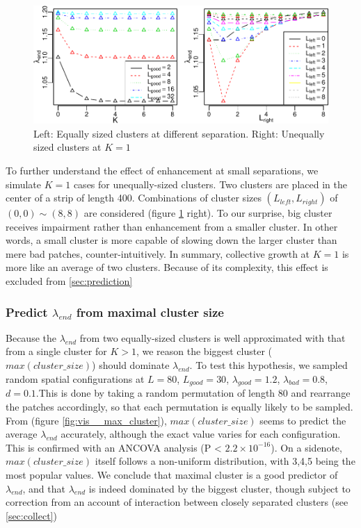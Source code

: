 \documentclass[a4paperpaper,]{article}
\begin{document}
\begin{figure}
\centering
\includegraphics{index_files/figure-latex/vis__lend_K_dp1-1.pdf}
\caption{\label{fig:vis__K} Left: Equally sized clusters at different
separation. Right: Unequally sized clusters at \(K = 1\)}
\end{figure}

To further understand the effect of enhancement at small separations, we
simulate \(K = 1\) cases for unequally-sized clusters. Two clusters are
placed in the center of a strip of length 400. Combinations of cluster
sizes \((L_{left},L_{right})\) of \((0,0)\sim (8,8)\) are considered
(figure \ref{fig:vis__K} right). To our surprise, big cluster receives
impairment rather than enhancement from a smaller cluster. In other
words, a small cluster is more capable of slowing down the larger
cluster than mere bad patches, counter-intuitively. In summary,
collective growth at \(K = 1\) is more like an average of two clusters.
Because of its complexity, this effect is excluded from
\ref{sec:prediction}

\subsubsection{\texorpdfstring{Predict \(\lambda_{end}\) from maximal
cluster size
\label{sec:prediction}}{Predict \textbackslash{}lambda\_\{end\} from maximal cluster size }}\label{predict-lambda_end-from-maximal-cluster-size}

\newcommand{\pvalue}{$2.2\times 10^{-16}$}

Because the \(\lambda_{end}\) from two equally-sized clusters is well
approximated with that from a single cluster for \(K > 1\), we reason
the biggest cluster (\(max(cluster\_size)\)) should dominate
\(\lambda_{end}\). To test this hypothesis, we sampled random spatial
configurations at \(L = 80\), \(L_{good} = 30\), \(\lambda_{good}=1.2\),
\(\lambda_{bad}=0.8\), \(d=0.1\).This is done by taking a random
permutation of length 80 and rearrange the patches accordingly, so that
each permutation is equally likely to be sampled. From (figure
\ref{fig:vis__max_cluster}), \(max(cluster\_size)\) seems to predict the
average \(\lambda_{end}\) accurately, although the exact value varies
for each configuration. This is confirmed with an ANCOVA analysis (P
\textless{} \pvalue). On a sidenote, \(max(cluster\_size)\) itself
follows a non-uniform distribution, with 3,4,5 being the most popular
values. We conclude that maximal cluster is a good predictor of
\(\lambda_{end}\), and that \(\lambda_{end}\) is indeed dominated by the
biggest cluster, though subject to correction from an account of
interaction between closely separated clusters (see \ref{sec:collect})
\end{document}
